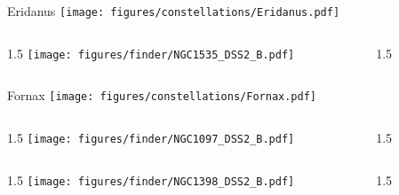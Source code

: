 \documentclass[final]{beamer}
\newlength{\colwidth}
\begin{document}
\begin{frame}[t]{\LARGE Eridanus}
  \centering
  \texttt{[image: figures/constellations/Eridanus.pdf]}
\end{frame}


\begin{frame}[t]{}
  \begin{columns}[T]
    \begin{column}{1.5\colwidth}
      \centering
      \texttt{[image: figures/finder/NGC1535\_DSS2\_B.pdf]}
    \end{column}
    \begin{column}{1.5\colwidth}
      \Large
      
    \end{column}
  \end{columns}
  \vspace{\fill}
\end{frame}


\begin{frame}[t]{\LARGE Fornax}
  \centering
  \texttt{[image: figures/constellations/Fornax.pdf]}
\end{frame}


\begin{frame}[t]{}
  \begin{columns}[T]
    \begin{column}{1.5\colwidth}
      \centering
      \texttt{[image: figures/finder/NGC1097\_DSS2\_B.pdf]}
    \end{column}
    \begin{column}{1.5\colwidth}
      \Large
      
    \end{column}
  \end{columns}
  \vspace{\fill}
  \begin{columns}[T]
    \begin{column}{1.5\colwidth}
      \centering
      \texttt{[image: figures/finder/NGC1398\_DSS2\_B.pdf]}
    \end{column}
    \begin{column}{1.5\colwidth}
      \Large
      
    \end{column}
  \end{columns}
\end{frame}
\end{document}

